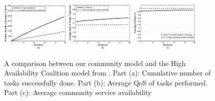 \documentclass[10pt,journal,cspaper,compsoc]{IEEEtran}
\begin{document}
\begin{figure}%
\centering
\includegraphics[width=1.3in]{avg_task_ws_done.eps}
\includegraphics[width=1.3in]{avg_qos_ws_done.eps}
\includegraphics[width=1.3in]{avg_avail_ws_done.eps}
\caption{A comparison between our community model and the High
Availability Coalition model from \cite{10.1109/TSC.2012.12}. Part
(a): Cumulative number of tasks successfully done. Part (b):
Average QoS of tasks performed. Part (c): Average community
service availability} \label{fig_avail_method}
\end{figure}
\end{document}

